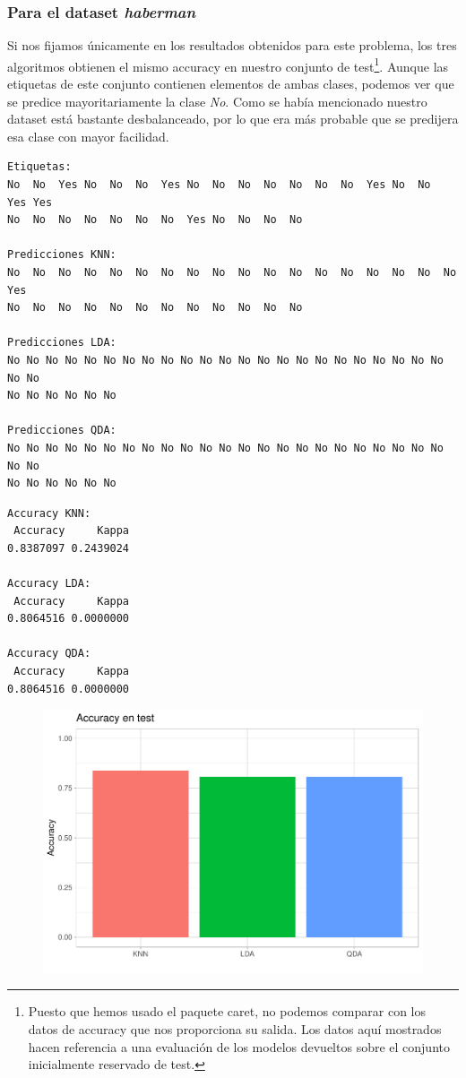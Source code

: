 \subsubsection{Para el dataset \textit{haberman}}

Si nos fijamos únicamente en los resultados obtenidos para este problema, los tres algoritmos obtienen el mismo accuracy en nuestro conjunto de test\footnote{Puesto que hemos usado el paquete caret, no podemos comparar con los datos de accuracy que nos proporciona su salida. Los datos aquí mostrados hacen referencia a una evaluación de los modelos devueltos sobre el conjunto inicialmente reservado de test.}. Aunque las etiquetas de este conjunto contienen elementos de ambas clases, podemos ver que se predice mayoritariamente la clase \textit{No}. Como se había mencionado nuestro dataset está bastante desbalanceado, por lo que era más probable que se predijera esa clase con mayor facilidad.

\begin{verbatim}
Etiquetas:
No  No  Yes No  No  No  Yes No  No  No  No  No  No  No  Yes No  No  Yes Yes
No  No  No  No  No  No  No  Yes No  No  No  No 

Predicciones KNN:
No  No  No  No  No  No  No  No  No  No  No  No  No  No  No  No  No  No  Yes
No  No  No  No  No  No  No  No  No  No  No  No 

Predicciones LDA:
No No No No No No No No No No No No No No No No No No No No No No No No No
No No No No No No

Predicciones QDA:
No No No No No No No No No No No No No No No No No No No No No No No No No
No No No No No No
\end{verbatim}

\vspace{\baselineskip}

\begin{verbatim}
Accuracy KNN:
 Accuracy     Kappa 
0.8387097 0.2439024  

Accuracy LDA:
 Accuracy     Kappa 
0.8064516 0.0000000 

Accuracy QDA:
 Accuracy     Kappa 
0.8064516 0.0000000 
\end{verbatim}

\begin{figure}[H]\center\includegraphics[width=.9\linewidth]{img/Clasificacion_files/figure-latex/unnamed-chunk-33-1}\caption{}\end{figure}

